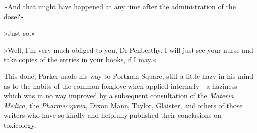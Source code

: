 »And that might have happened at any time after the administration of the dose?«

»Just so.«

»Well, I'm very much obliged to you, Dr Penberthy. I will just see your nurse and take copies of the entries in your books, if I may.«

This done, Parker made his way to Portman Square, still a little hazy in his mind as to the habits of the common foxglove when applied internally—a haziness which was in no way improved by a subsequent consultation of the \textit{Materia Medica}, the \textit{Pharmacopœia}, Dixon Mann, Taylor, Glaister, and others of those writers who have so kindly and helpfully published their conclusions on toxicology.